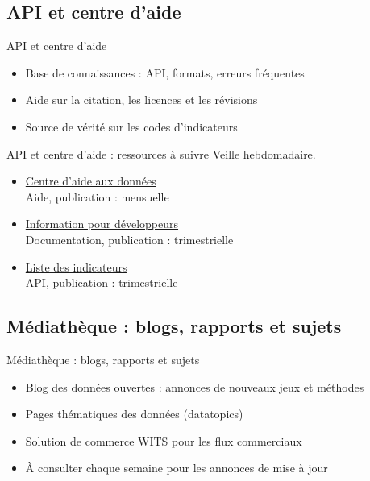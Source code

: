 \documentclass[aspectratio=169,11pt]{beamer}
\begin{document}
\subsection{API et centre d'aide}
\begin{frame}{API et centre d'aide}
\begin{itemize}
\item Base de connaissances : API, formats, erreurs fréquentes
\item Aide sur la citation, les licences et les révisions
\item Source de vérité sur les codes d'indicateurs
\end{itemize}
\end{frame}

\begin{frame}{API et centre d'aide : ressources à suivre}
\small
Veille hebdomadaire.
\begin{itemize}
\item \href{https://datahelpdesk.worldbank.org}{Centre d'aide aux données}\\{\footnotesize Aide, publication : mensuelle}
\item \href{https://datahelpdesk.worldbank.org/knowledgebase/articles/889386-developer-information}{Information pour développeurs}\\{\footnotesize Documentation, publication : trimestrielle}
\item \href{https://api.worldbank.org/v2/indicator?format=json&per_page=5}{Liste des indicateurs}\\{\footnotesize API, publication : trimestrielle}
\end{itemize}
\end{frame}

\subsection{Médiathèque : blogs, rapports et sujets}
\begin{frame}{Médiathèque : blogs, rapports et sujets}
\begin{itemize}
\item Blog des données ouvertes : annonces de nouveaux jeux et méthodes
\item Pages thématiques des données (datatopics)
\item Solution de commerce WITS pour les flux commerciaux
\item À consulter chaque semaine pour les annonces de mise à jour
\end{itemize}
\end{frame}
\end{document}
